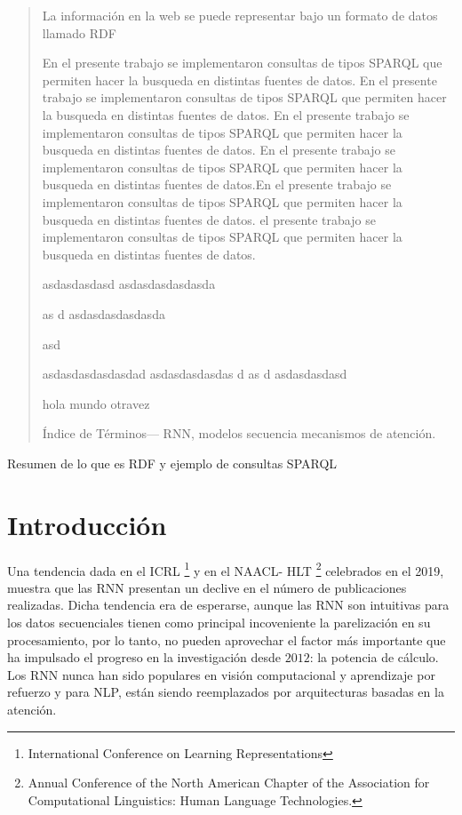 \documentclass[conference]{IEEEtran}
\begin{document}
\begin{abstract}
La información en la web se puede representar bajo un formato de datos llamado RDF

En el presente trabajo se implementaron consultas de tipos SPARQL que permiten hacer la busqueda en distintas fuentes de datos.
En el presente trabajo se implementaron consultas de tipos SPARQL que permiten hacer la busqueda en distintas fuentes de datos.
En el presente trabajo se implementaron consultas de tipos SPARQL que permiten hacer la busqueda en distintas fuentes de datos.
En el presente trabajo se implementaron consultas de tipos SPARQL que permiten hacer la busqueda en distintas fuentes de datos.En el presente trabajo se implementaron consultas de tipos SPARQL que permiten hacer la busqueda en distintas fuentes de datos.
 el presente trabajo se implementaron consultas de tipos SPARQL que permiten hacer la busqueda en distintas fuentes de datos.


 asdasdasdasd
 asdasdasdasdasda

 as
 d
 asdasdasdasdasda


 asd

 asdasdasdasdasdad
 asdasdasdasdas
 d
 as
 d
 asdasdasdasd
 


hola mundo otravez 
\vspace{0.2cm}


\'Indice de T\'erminos— RNN, modelos secuencia mecanismos de atenci\'on.
    
\end{abstract}

Resumen de lo que es RDF y ejemplo de consultas SPARQL

\section{Introducción}
Una tendencia dada en el ICRL \footnote{International Conference on Learning Representations } y en el NAACL- HLT \footnote{Annual Conference of the North American Chapter of the Association for Computational Linguistics: Human Language Technologies.} celebrados en el 2019,  muestra que las RNN presentan un declive en el n\'umero de publicaciones realizadas. Dicha tendencia era de esperarse, aunque las RNN son intuitivas para los datos secuenciales tienen como principal incoveniente la parelización en su procesamiento, por lo tanto, no pueden aprovechar el factor m\'as importante que ha impulsado el progreso en la investigaci\'on desde $2012$: la potencia de c\'alculo. Los RNN nunca han sido populares en visi\'on computacional y aprendizaje por refuerzo y para NLP, est\'an siendo reemplazados por arquitecturas basadas en la atenci\'on.
\end{document}
